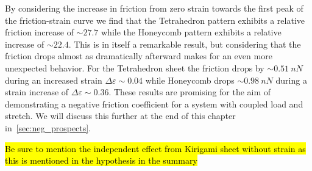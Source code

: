 By considering the increase in friction from zero strain towards the first peak
of the friction-strain curve we find that the Tetrahedron pattern exhibits a
relative friction increase of $\sim 27.7$ while the Honeycomb pattern exhibits a
relative increase of $\sim 22.4$. This is in itself a remarkable result, but
considering that the friction drops almost as dramatically afterward makes for
an even more unexpected behavior. For the Tetrahedron sheet the friction drops by
$\sim \SI{0.51}{nN}$ during an increased strain $\Delta \varepsilon \sim 0.04$
while Honeycomb drops $\sim\SI{0.98}{nN}$ during a strain increase of $\Delta \varepsilon \sim 0.36$. These results are promising for the aim of demonstrating a negative friction coefficient for a system with coupled load and stretch. We will discuss this further at the end of this chapter in~\cref{sec:neg_prospects}.


\hl{Be sure to mention the independent effect from Kirigami sheet without strain as this is mentioned in the hypothesis in the summary}



